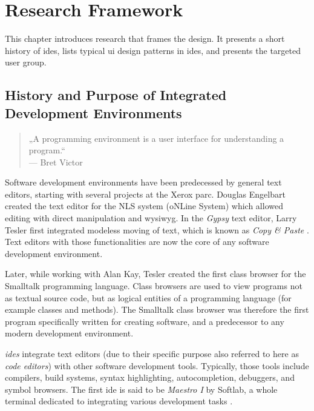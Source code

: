 \chapter{Research Framework}\label{research}

This chapter introduces research that frames the design. It presents a
short history of \glspl{ide}, lists typical \gls{ui} design patterns in
\glspl{ide}, and presents the targeted user group.

\section{History and Purpose of Integrated Development
Environments}\label{history-and-purpose-of-integrated-development-environments}

\begin{quote}
„A programming environment is a user interface for understanding a
program.“\\— Bret Victor \citeyear{victor}
\end{quote}

Software development environments have been predecessed by general text
editors, starting with several projects at the Xerox \gls{parc}. Douglas
Engelbart created the text editor for the NLS system (oNLine System)
which allowed editing with direct manipulation and \gls{wysiwyg}. In the
\emph{Gypsy} text editor, Larry Tesler first integrated modeless moving
of text, which is known as \emph{Copy \& Paste} \cite{moggridge}. Text
editors with those functionalities are now the core of any software
development environment.

Later, while working with Alan Kay, Tesler created the first class
browser for the Smalltalk programming language. Class browsers are used
to view programs not as textual source code, but as logical entities of
a programming language (for example classes and methods). The Smalltalk
class browser was therefore the first program specifically written for
creating software, and a predecessor to any modern development
environment.

\emph{\glspl{ide}} integrate text editors (due to their specific purpose
also referred to here as \emph{code editors}) with other software
development tools. Typically, those tools include compilers, build
systems, syntax highlighting, autocompletion, debuggers, and symbol
browsers. The first \ac{ide} is said to be \emph{Maestro I} by Softlab,
a whole terminal dedicated to integrating various development tasks
\cite{maestro}.

